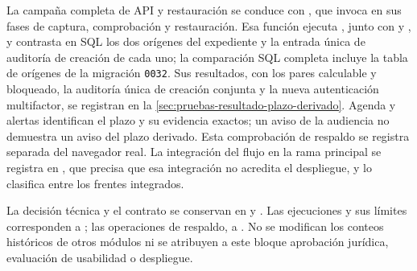 {\raggedright La campaña completa de API y restauración se conduce con , que  invoca en sus fases de captura, comprobación y restauración. Esa función ejecuta , junto con  y , y contrasta en SQL los dos orígenes del expediente y la entrada única de auditoría de creación de cada uno; la comparación SQL completa incluye la tabla de orígenes de la migración \texttt{0032}. Sus resultados, con los pares calculable y bloqueado, la auditoría única de creación conjunta y la nueva autenticación multifactor, se registran en la \cref{sec:pruebas-resultado-plazo-derivado}. Agenda y alertas identifican el plazo y su evidencia exactos; un aviso de la audiencia no demuestra un aviso del plazo derivado. Esta comprobación de respaldo se registra separada del navegador real. La integración del flujo en la rama principal se registra en , que precisa que esa integración no acredita el despliegue, y  lo clasifica entre los frentes integrados.\par}

{\raggedright La decisión técnica y el contrato se conservan en  y . Las ejecuciones y sus límites corresponden a ; las operaciones de respaldo, a . No se modifican los conteos históricos de otros módulos ni se atribuyen a este bloque aprobación jurídica, evaluación de usabilidad o despliegue.\par}
